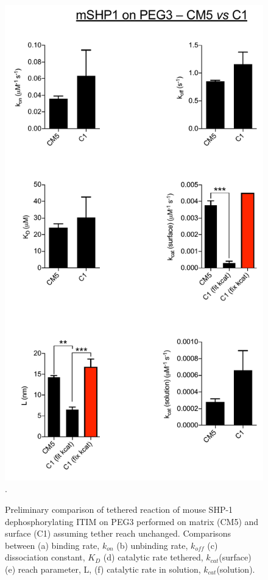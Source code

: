 \documentclass[../../AdvancementSummary.tex]{subfiles}
\begin{document}
\begin{figure}[h]
	\begin{center}
		\includegraphics[scale=0.5]{ResultsFigures/ExperimentalDataPlots/mSHP1_on_PEG3_CM5_vs_C1.pdf}. 
	\end{center}
	\caption{Preliminary comparison of tethered reaction of mouse SHP-1 dephosphorylating ITIM on PEG3 performed on matrix (CM5) and surface (C1) assuming tether reach unchanged. Comparisons between (a) binding rate, $k_{on}$ (b) unbinding rate, $k_{off}$ (c) dissociation constant, $K_D$ (d) catalytic rate tethered, $k_{cat}$(surface) (e) reach parameter, L, (f) catalytic rate in solution, $k_{cat}$(solution). \label{fig: PEG3Data}}
\end{figure}
\end{document}
